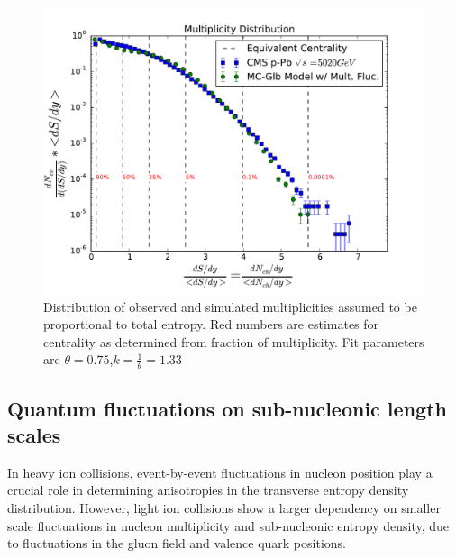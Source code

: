 \documentclass[twocolumn,showpacs,amsfonts,aps,prc,nofootinbib,floatfix]{revtex4}
\begin{document}
\begin{figure}[!ht] 
	\includegraphics[width = \linewidth]{figs/TotalEntropyDist.pdf}
	\caption{Distribution of observed and simulated multiplicities assumed to be proportional to total entropy. Red numbers are estimates for centrality as determined from fraction of multiplicity. Fit parameters are $\theta=0.75$,$k=\frac{1}{\theta}=1.33$}
	\label{fig:pPbMultDist}
\end{figure}
\subsection{Quantum fluctuations on sub-nucleonic length scales}
\label{sec2b}
In heavy ion collisions, event-by-event fluctuations in nucleon position play a crucial role in determining anisotropies in the transverse entropy density distribution. However, light ion collisions show a larger dependency on smaller scale fluctuations in nucleon multiplicity and sub-nucleonic entropy density, due to fluctuations in the gluon field and valence quark positions.
\end{document}
